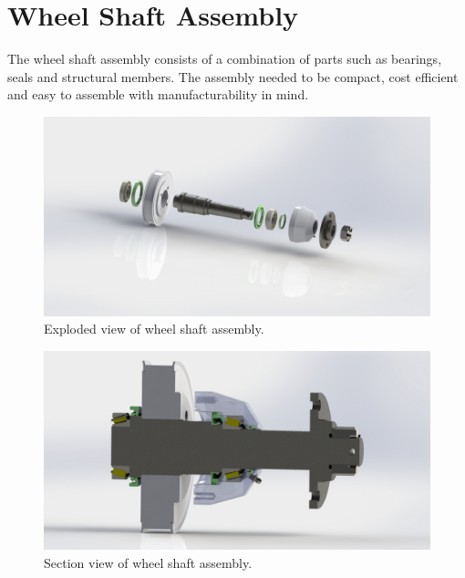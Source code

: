 \section{Wheel Shaft Assembly}\label{sec:wheel_shaft_assembly}
The wheel shaft assembly consists of a combination of parts such as bearings, seals and structural members. The assembly needed to be compact, cost efficient and easy to assemble with manufacturability in mind. %

\begin{figure}[H]\centering
	\includegraphics[width=.7\linewidth]{images/explode_wheel_assembly.jpg}
	\caption{Exploded view of wheel shaft assembly.}
	\label{fig:wheel_explode}
\end{figure}

\begin{figure}[H]\centering
	\includegraphics[width=.7\linewidth]{images/wheel_shaft_section.jpg}
	\caption{Section view of wheel shaft assembly.}
	\label{fig:wheel_section}
\end{figure}

